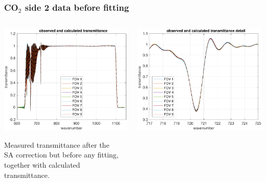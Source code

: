 \documentclass[9pt]{beamer}
\begin{document}
\begin{frame}
\frametitle{CO$_2$ side 2 data before fitting}
\begin{columns}[t]
\begin{column}{0.5\textwidth}  
  \begin{centering}
  \includegraphics[width=\textwidth]{02-05_mn_s2_CO2/spec_test2_all.pdf}
  \end{centering}\vspace{3mm}

Measured transmittance after the \\ SA correction but before any
fitting, together with calculated transmittance.

\end{column}

\begin{column}{0.5\textwidth}
  \begin{centering}
  \includegraphics[width=\textwidth]{02-05_mn_s2_CO2/spec_test2_zoom.pdf}
  \end{centering}\vspace{3mm}


\end{column}
\end{columns}
\end{frame}
\end{document}
